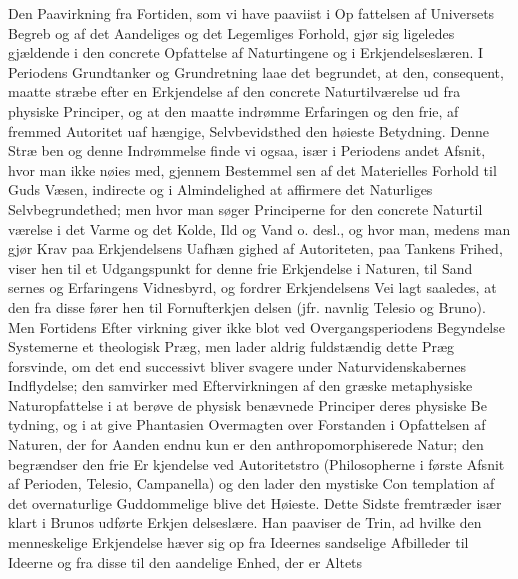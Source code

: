 \documentclass[12pt,a4paper]{book}
\begin{document}
Den Paavirkning fra Fortiden, som vi have paaviist i Op\-%
fattelsen af Universets Begreb og af det Aandeliges og det
Legemliges Forhold, gjør sig ligeledes gjældende i den concrete
Opfattelse af Naturtingene og i Erkjendelseslæren. I Periodens
Grundtanker og Grundretning laae det begrundet, at den,
consequent, maatte stræbe efter en Erkjendelse af den concrete
Naturtilværelse ud fra physiske Principer, og at den maatte
indrømme Erfaringen og den frie, af fremmed Autoritet uaf\-%
hængige, Selvbevidsthed den høieste Betydning. Denne Stræ\-%
ben og denne Indrømmelse finde vi ogsaa, især i Periodens
andet Afsnit, hvor man ikke nøies med, gjennem Bestemmel\-%
sen af det Materielles Forhold til Guds Væsen, indirecte og i
Almindelighed at affirmere det Naturliges Selvbegrundethed;
men hvor man søger Principerne for den concrete Naturtil\-%
værelse i det Varme og det Kolde, Ild og Vand o. desl., og
hvor man, medens man gjør Krav paa Erkjendelsens Uafhæn\-%
gighed af Autoriteten, paa Tankens Frihed, viser hen til et
Udgangspunkt for denne frie Erkjendelse i Naturen, til Sand\-%
sernes og Erfaringens Vidnesbyrd, og fordrer Erkjendelsens Vei
lagt saaledes, at den fra disse fører hen til Fornufterkjen\-%
delsen (jfr. navnlig Telesio og Bruno). Men Fortidens Efter\-%
virkning giver ikke blot ved Overgangsperiodens Begyndelse
Systemerne et theologisk Præg, men lader aldrig fuldstændig
dette Præg forsvinde, om det end successivt bliver svagere
under Naturvidenskabernes Indflydelse; den samvirker med
Eftervirkningen af den græske metaphysiske Naturopfattelse i
at berøve de physisk benævnede Principer deres physiske Be\-%
tydning, og i at give Phantasien Overmagten over Forstanden
i Opfattelsen af Naturen, der for Aanden endnu kun er den
anthropomorphiserede Natur; den begrændser den frie Er\-%
kjendelse ved Autoritetstro (Philosopherne i første Afsnit af
Perioden, Telesio, Campanella) og den lader den mystiske Con\-%
templation af det overnaturlige Guddommelige blive det Høieste.
Dette Sidste fremtræder især klart i Brunos udførte Erkjen\-%
delseslære. Han paaviser de Trin, ad hvilke den menneskelige
Erkjendelse hæver sig op fra Ideernes sandselige Afbilleder til
Ideerne og fra disse til den aandelige Enhed, der er Altets
\end{document}

